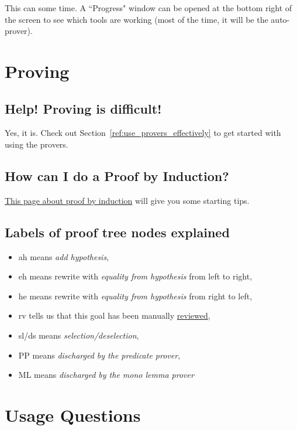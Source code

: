 This can some time. A ``Progress" window can be opened at the bottom right of the screen to see which tools are working (most of the time, it will be the auto-prover). 

\section{Proving}

\subsection{Help!  Proving is difficult!}

Yes, it is.  Check out Section~\ref{ref:use_provers_effectively} to get started with using the provers.


\subsection{How can I do a Proof by Induction?}

\href{http://wiki.event-b.org/index.php/Induction_proof}{This page about proof by induction} will give you some starting tips.

\subsection{Labels of proof tree nodes explained}

\begin{itemize}
	\item \textsf{ah} means \textit{add hypothesis},
	\item \textsf{eh} means rewrite with \textit{equality from hypothesis} from left to right,
	\item \textsf{he} means rewrite with \textit{equality from hypothesis} from right to left,
	\item \textsf{rv} tells us that this goal has been manually \href{http://wiki.event-b.org/index.php/The_Proving_Perspective_(Rodin_User_Manual)#The_Proof_Control_Window}{reviewed},
	\item \textsf{sl/ds} means \textit{selection/deselection},
	\item \textsf{PP} means \textit{discharged by the predicate prover},
	\item \textsf{ML} means \textit{discharged by the mono lemma prover}
\end{itemize}

\section{Usage Questions}

